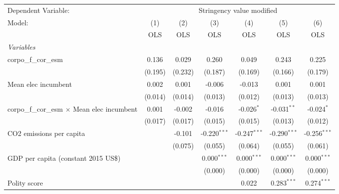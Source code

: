 
\begingroup
\centering
\begin{tabular}{lcccccc}
   \toprule
   Dependent Variable: & \multicolumn{6}{c}{Stringency value modified}\\
   Model:                                              & (1)     & (2)     & (3)            & (4)            & (5)            & (6)\\  
                                                       &  OLS    & OLS     & OLS            & OLS            & OLS            & OLS\\  
   \midrule
   \emph{Variables}\\
   corpo\_f\_cor\_esm                                  & 0.136   & 0.029   & 0.260          & 0.049          & 0.243          & 0.225\\   
                                                       & (0.195) & (0.232) & (0.187)        & (0.169)        & (0.166)        & (0.179)\\   
   Mean elec incumbent                                 & 0.002   & 0.001   & -0.006         & -0.013         & 0.001          & 0.001\\   
                                                       & (0.014) & (0.014) & (0.013)        & (0.012)        & (0.013)        & (0.013)\\   
   corpo\_f\_cor\_esm $\times$ Mean elec incumbent     & 0.001   & -0.002  & -0.016         & -0.026$^{*}$   & -0.031$^{**}$  & -0.024$^{*}$\\   
                                                       & (0.017) & (0.017) & (0.015)        & (0.015)        & (0.013)        & (0.012)\\   
   CO2 emissions per capita                            &         & -0.101  & -0.220$^{***}$ & -0.247$^{***}$ & -0.290$^{***}$ & -0.256$^{***}$\\   
                                                       &         & (0.075) & (0.055)        & (0.064)        & (0.055)        & (0.061)\\   
   GDP per capita (constant 2015 US\$)                 &         &         & 0.000$^{***}$  & 0.000$^{***}$  & 0.000$^{***}$  & 0.000$^{***}$\\   
                                                       &         &         & (0.000)        & (0.000)        & (0.000)        & (0.000)\\   
   Polity score                                        &         &         &                & 0.022          & 0.283$^{***}$  & 0.274$^{***}$\\   

\end{tabular}
